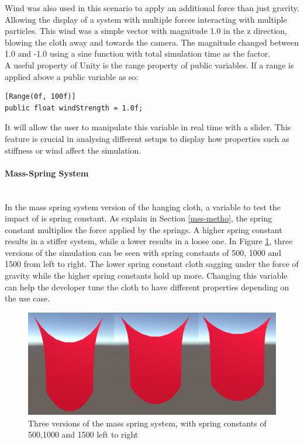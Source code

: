 \documentclass[12pt,a4paper]{article}
\begin{document}
Wind was also used in this scenario to apply an additional force than just gravity. Allowing the display of a system with multiple forces interacting with multiple particles. This wind was a simple vector with magnitude 1.0 in the z direction, blowing the cloth away and towards the camera. The magnitude changed between 1.0 and -1.0 using a sine function with total simulation time as the factor. \\

A useful property of Unity is the range property of public variables. If a range is applied above a public variable as so:
\begin{lstlisting}[caption={Unity's range feature},label={lst:rng}]
[Range(0f, 100f)]
public float windStrength = 1.0f;
\end{lstlisting}
It will allow the user to manipulate this variable in real time with a slider. This feature is crucial in analysing different setups to display how properties such as stiffness or wind affect the simulation.

\paragraph{Mass-Spring System} \mbox{} \\
In the mass spring system version of the hanging cloth, a variable to test the impact of is spring constant. As explain in Section \ref{mss-metho}, the spring constant multiplies the force applied by the springs. A higher spring constant results in a stiffer system, while a lower results in a loose one. In Figure \ref{fig:msscomp}, three versions of the simulation can be seen with spring constants of 500, 1000 and 1500 from left to right. The lower spring constant cloth sagging under the force of gravity while the higher spring constants hold up more. Changing this variable can help the developer tune the cloth to have different properties depending on the use case.

\begin{figure}
	\centering
	\includegraphics[scale=0.35]{msscomp.png}
	\caption{Three versions of the mass spring system, with spring constants of 500,1000 and 1500 left to right}
	\label{fig:msscomp}
\end{figure}
\end{document}
